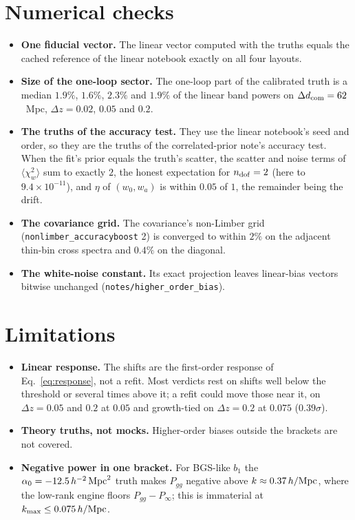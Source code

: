 \documentclass[11pt]{article}
\newcommand{\kmax}{k_{\rm max}}
\newcommand{\hMpc}{\,h/{\rm Mpc}}
\begin{document}
\section{Numerical checks}
\label{app:checks}

\begin{itemize}
  \item \textbf{One fiducial vector.}  The linear vector computed with
    the truths equals the cached reference of the linear notebook
    exactly on all four layouts.
  \item \textbf{Size of the one-loop sector.}  The one-loop part of
    the calibrated truth is a median $1.9\%$, $1.6\%$, $2.3\%$ and
    $1.9\%$ of the linear band powers on $\Delta d_{\rm com} = 62$~Mpc,
    $\Delta z = 0.02$, $0.05$ and $0.2$.
  \item \textbf{The truths of the accuracy test.}  They use the linear
    notebook's seed and order, so they are the truths of the
    correlated-prior note's accuracy test.  When the fit's prior
    equals the truth's scatter, the scatter and noise terms of
    $\langle\chi^2_w\rangle$ sum to exactly $2$, the honest
    expectation for $n_{\rm dof} = 2$ (here to
    $9.4\times10^{-11}$), and $\eta$ of $(w_0, w_a)$ is within $0.05$ of
    $1$, the remainder being the drift.
  \item \textbf{The covariance grid.}  The covariance's non-Limber
    grid (\texttt{nonlimber\_accuracyboost} 2) is converged to within
    $2\%$ on the adjacent thin-bin cross spectra and $0.4\%$ on the
    diagonal.
  \item \textbf{The white-noise constant.}  Its exact projection
    leaves linear-bias vectors bitwise unchanged
    (\texttt{notes/higher\_order\_bias}).
\end{itemize}

\section{Limitations}
\label{app:limits}

\begin{itemize}
  \item \textbf{Linear response.}  The shifts are the first-order
    response of Eq.~\eqref{eq:response}, not a refit.  Most verdicts
    rest on shifts well below the threshold or several times above
    it; a refit could move those near it, on $\Delta z = 0.05$ and
    $0.2$ at $0.05$ and growth-tied on $\Delta z = 0.2$ at $0.075$
    ($0.39\sigma$).
  \item \textbf{Theory truths, not mocks.}  Higher-order biases
    outside the brackets are not covered.
  \item \textbf{Negative power in one bracket.}  For BGS-like $b_1$
    the $\alpha_0 = -12.5\,h^{-2}\,{\rm Mpc}^2$ truth makes $P_{gg}$
    negative above $k \approx 0.37\hMpc$, where the low-rank engine
    floors $P_{gg} - P_\infty$; this is immaterial at
    $\kmax \le 0.075\hMpc$.
\end{itemize}
\end{document}
